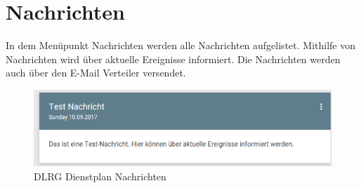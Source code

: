 \chapter{Nachrichten}
\label{cha:nachrichten}

In dem Menüpunkt Nachrichten werden alle Nachrichten aufgelistet. Mithilfe von Nachrichten wird über aktuelle Ereignisse informiert. Die Nachrichten werden auch über den E-Mail Verteiler versendet.

\begin{figure}[h]
 \begin{addmargin}{-0.2\linewidth}
   \centering 
   \includegraphics[width=15cm]{Bilder/view_news.png}
 \end{addmargin} 
 \caption[Nachrichten]{DLRG Dienstplan Nachrichten}
 \label{fig:view_news}
\end{figure}
